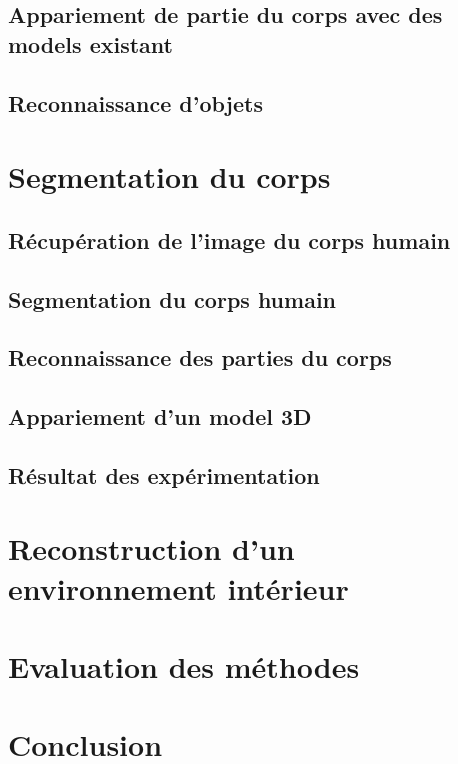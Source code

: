 \documentclass[a4paper,11pt]{article}
\begin{document}
\subsection{Appariement de partie du corps avec des models existant}

\subsection{Reconnaissance d'objets}

\section{Segmentation du corps}
\subsection{Récupération de l'image du corps humain}
\subsection{Segmentation du corps humain}
\subsection{Reconnaissance des parties du corps}
\subsection{Appariement d'un model 3D}
\subsection{Résultat des expérimentation}

\section{Reconstruction d'un environnement intérieur}

\section{Evaluation des méthodes}

\section{Conclusion}
\end{document}
